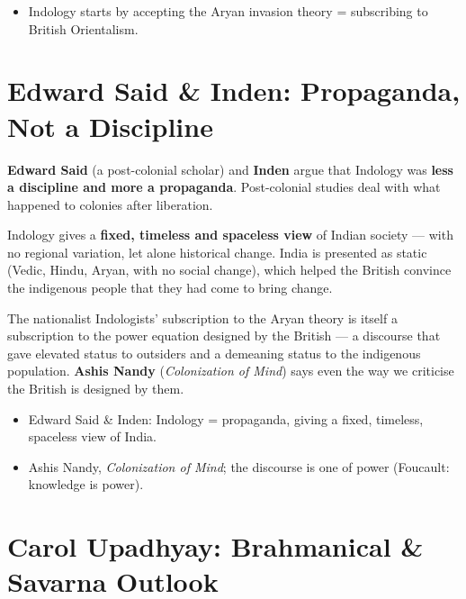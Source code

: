 \begin{QuickRevision}
\begin{itemize}
\item Indology starts by accepting the Aryan invasion theory = subscribing to British Orientalism.
\end{itemize}
\end{QuickRevision}

\section{Edward Said \& Inden: Propaganda, Not a Discipline}

\textbf{Edward Said} (a post-colonial scholar) and \textbf{Inden} argue that Indology was \textbf{less a discipline and more a propaganda}. Post-colonial studies deal with what happened to colonies after liberation.

\begin{KeyConcept}
Indology gives a \textbf{fixed, timeless and spaceless view} of Indian society --- with no regional variation, let alone historical change. India is presented as static (Vedic, Hindu, Aryan, with no social change), which helped the British convince the indigenous people that they had come to bring change.
\end{KeyConcept}

\begin{CriticalPoint}
The nationalist Indologists' subscription to the Aryan theory is itself a subscription to the power equation designed by the British --- a discourse that gave elevated status to outsiders and a demeaning status to the indigenous population. \textbf{Ashis Nandy} (\emph{Colonization of Mind}) says even the way we criticise the British is designed by them.
\end{CriticalPoint}

\begin{QuickRevision}
\begin{itemize}
\item Edward Said \& Inden: Indology = propaganda, giving a fixed, timeless, spaceless view of India.
\item Ashis Nandy, \emph{Colonization of Mind}; the discourse is one of power (Foucault: knowledge is power).
\end{itemize}
\end{QuickRevision}

\section{Carol Upadhyay: Brahmanical \& Savarna Outlook}

